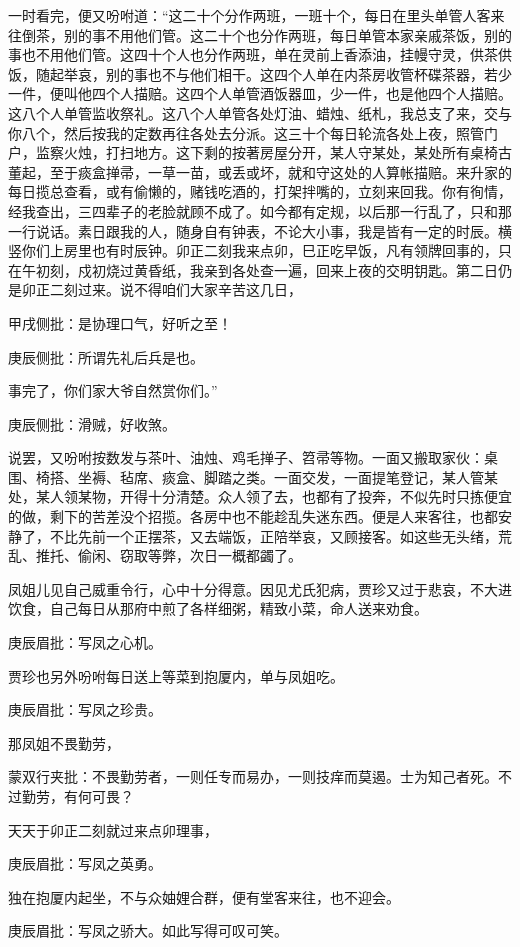 \begin{parag}
    一时看完，便又吩咐道：“这二十个分作两班，一班十个，每日在里头单管人客来往倒茶，别的事不用他们管。这二十个也分作两班，每日单管本家亲戚茶饭，别的事也不用他们管。这四十个人也分作两班，单在灵前上香添油，挂幔守灵，供茶供饭，随起举哀，别的事也不与他们相干。这四个人单在内茶房收管杯碟茶器，若少一件，便叫他四个人描赔。这四个人单管酒饭器皿，少一件，也是他四个人描赔。这八个人单管监收祭礼。这八个人单管各处灯油、蜡烛、纸札，我总支了来，交与你八个，然后按我的定数再往各处去分派。这三十个每日轮流各处上夜，照管门户，监察火烛，打扫地方。这下剩的按著房屋分开，某人守某处，某处所有桌椅古董起，至于痰盒掸帚，一草一苗，或丢或坏，就和守这处的人算帐描赔。来升家的每日揽总查看，或有偷懒的，赌钱吃酒的，打架拌嘴的，立刻来回我。你有徇情，经我查出，三四辈子的老脸就顾不成了。如今都有定规，以后那一行乱了，只和那一行说话。素日跟我的人，随身自有钟表，不论大小事，我是皆有一定的时辰。横竖你们上房里也有时辰钟。卯正二刻我来点卯，巳正吃早饭，凡有领牌回事的，只在午初刻，戍初烧过黄昏纸，我亲到各处查一遍，回来上夜的交明钥匙。第二日仍是卯正二刻过来。说不得咱们大家辛苦这几日，\begin{note}甲戌侧批：是协理口气，好听之至！\end{note}\begin{note}庚辰侧批：所谓先礼后兵是也。\end{note}事完了，你们家大爷自然赏你们。”\begin{note}庚辰侧批：滑贼，好收煞。\end{note}
\end{parag}


\begin{parag}
    说罢，又吩咐按数发与茶叶、油烛、鸡毛掸子、笤帚等物。一面又搬取家伙：桌围、椅搭、坐褥、毡席、痰盒、脚踏之类。一面交发，一面提笔登记，某人管某处，某人领某物，开得十分清楚。众人领了去，也都有了投奔，不似先时只拣便宜的做，剩下的苦差没个招揽。各房中也不能趁乱失迷东西。便是人来客往，也都安静了，不比先前一个正摆茶，又去端饭，正陪举哀，又顾接客。如这些无头绪，荒乱、推托、偷闲、窃取等弊，次日一概都蠲了。
\end{parag}


\begin{parag}
    凤姐儿见自己威重令行，心中十分得意。因见尤氏犯病，贾珍又过于悲哀，不大进饮食，自己每日从那府中煎了各样细粥，精致小菜，命人送来劝食。\begin{note}庚辰眉批：写凤之心机。\end{note}贾珍也另外吩咐每日送上等菜到抱厦内，单与凤姐吃。\begin{note}庚辰眉批：写凤之珍贵。\end{note}那凤姐不畏勤劳，\begin{note}蒙双行夹批：不畏勤劳者，一则任专而易办，一则技痒而莫遏。士为知己者死。不过勤劳，有何可畏？\end{note}天天于卯正二刻就过来点卯理事，\begin{note}庚辰眉批：写凤之英勇。\end{note}独在抱厦内起坐，不与众妯娌合群，便有堂客来往，也不迎会。\begin{note}庚辰眉批：写凤之骄大。如此写得可叹可笑。\end{note}
\end{parag}


